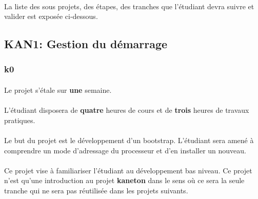 \documentclass[10pt,a4wide]{article}
\begin{document}
\paragraph{}

La liste des sous projets, des \'etapes, des tranches que l'\'etudiant
devra suivre et valider est expos\'ee ci-dessous.

\newpage

\subsection{KAN1: Gestion du d\'emarrage}

\paragraph{}

\subsubsection{k0}

\paragraph{}

Le projet s'\'etale sur \textbf{une} semaine.

\paragraph{}

L'\'etudiant disposera de \textbf{quatre} heures de cours et de \textbf{trois}
heures de travaux pratiques.

\paragraph{}

Le but du projet est le d\'eveloppement d'un bootstrap.
L'\'etudiant sera amen\'e \`a comprendre un mode d'adressage du processeur
et d'en installer un nouveau.

\paragraph{}

Ce projet vise \`a familiariser l'\'etudiant au d\'eveloppement bas
niveau. Ce projet n'est qu'une introduction au projet \textbf{kaneton}
dans le sens o\`u ce sera la seule tranche qui ne sera pas r\'eutilis\'ee
dans les projets suivants.
\end{document}
